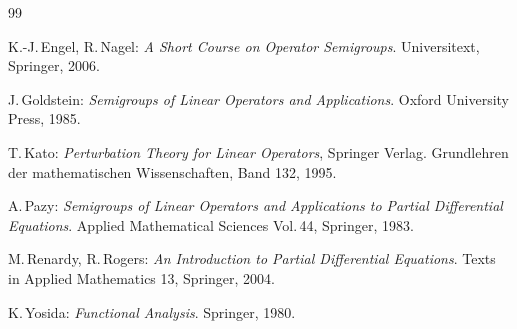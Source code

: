 \documentclass[11pt,twoside]{article}
\begin{document}
\vspace{8mm}
\begin{thebibliography}{99}
\begin{small}

  K.-J.\,Engel, R.\,Nagel:
\textit{A Short Course on Operator Semigroups}.
Universitext, Springer, 2006.

  J.\,Goldstein:
\textit{Semigroups of Linear Operators and Applications}.
Oxford University Press, 1985.

 T.\,Kato:
\textit{Perturbation Theory for Linear Operators}, Springer Verlag.
Grundlehren der mathematischen Wissenschaften, Band 132, 1995.

  A.\,Pazy:
\textit{Semigroups of Linear Operators
        and Applications to Partial Differential Equations}.
Applied Mathematical Sciences Vol.\,44, Springer, 1983.

  M.\,Renardy, R.\,Rogers:
\textit{An Introduction to Partial Differential Equations}.
Texts in Applied Mathematics 13, Springer, 2004.

  K.\,Yosida:
\textit{Functional Analysis}.
Springer, 1980.

\end{small}
\end{thebibliography}
\end{document}
